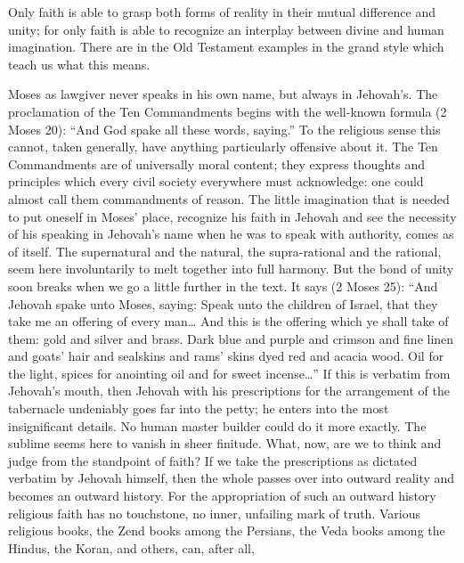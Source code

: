 \documentclass[12pt,a4paper,openany]{book}
\newcommand{\opage}[1]{\marginnote{\footnotesize\textit{[#1]}}}
\begin{document}
Only faith is able to grasp both forms of reality in their mutual difference and unity; for only faith is able to recognize an interplay between divine and human imagination. There are in the Old Testament examples in the grand style which teach us what this means.

Moses as lawgiver never speaks in his own name, but always in Jehovah's. The proclamation of the Ten Commandments begins with the well-known formula (2 Moses 20): ``And God spake all these words, saying.'' To the religious sense this cannot, taken generally, have anything particularly offensive about it. The Ten Commandments are of universally moral content; they express thoughts and principles which
\setcounter{footnote}{0}%
\opage{47}every civil society everywhere must acknowledge: one could almost call them commandments of reason. The little imagination that is needed to put oneself in Moses' place, recognize his faith in Jehovah and see the necessity of his speaking in Jehovah's name when he was to speak with authority, comes as of itself. The supernatural and the natural, the supra-rational and the rational, seem here involuntarily to melt together into full harmony. But the bond of unity soon breaks when we go a little further in the text. It says (2 Moses 25): ``And Jehovah spake unto Moses, saying: Speak unto the children of Israel, that they take me an offering of every man\dots{} And this is the offering which ye shall take of them: gold and silver and brass. Dark blue and purple and crimson and fine linen and goats' hair and sealskins and rams' skins dyed red and acacia wood. Oil for the light, spices for anointing oil and for sweet incense\dots{}'' If this is verbatim from Jehovah's mouth, then Jehovah with his prescriptions for the arrangement of the tabernacle undeniably goes far into the petty; he enters into the most insignificant details. No human master builder could do it more exactly. The sublime seems here to vanish in sheer finitude. What, now, are we to think and judge from the standpoint of faith? If we take the prescriptions as dictated verbatim by Jehovah himself, then the whole passes over into outward reality and becomes an outward history. For the appropriation of such an outward history religious faith has no touchstone, no inner, unfailing mark of truth. Various religious books, the Zend books among the Persians, the Veda books among the Hindus, the Koran, and others, can, after all,
\setcounter{footnote}{0}%
\end{document}
